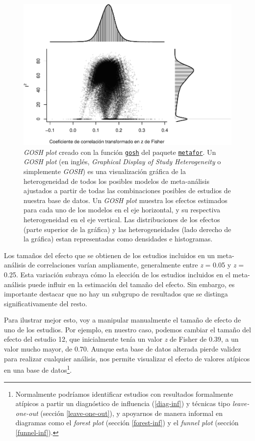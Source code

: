 \documentclass[
  bookmarksnumbered]{article}
\begin{document}
\begin{figure}
\centering
\includegraphics{Meta-analysis_files/figure-latex/gosh1-1.pdf}
\caption{\label{fig:gosh1}\emph{GOSH plot} creado con la función \href{https://www.metafor-project.org/doku.php/plots:gosh_plot}{\texttt{gosh}} del paquete \href{https://www.metafor-project.org/doku.php}{\texttt{metafor}}. Un \emph{GOSH plot} (en inglés, \emph{Graphical Display of Study Heterogeneity} o simplemente \emph{GOSH}) es una visualización gráfica de la heterogeneidad de todos los posibles modelos de meta-análisis ajustados a partir de todas las combinaciones posibles de estudios de nuestra base de datos. Un \emph{GOSH plot} muestra los efectos estimados para cada uno de los modelos en el eje horizontal, y su respectiva heterogeneidad en el eje vertical. Las distribuciones de los efectos (parte superior de la gráfica) y las heterogeneidades (lado derecho de la gráfica) estan representadas como densidades e histogramas.}
\end{figure}

Los tamaños del efecto que se obtienen de los estudios incluidos en un meta-análisis de correlaciones varían ampliamente, generalmente entre \emph{z} = 0.05 y \emph{z} = 0.25. Esta variación subraya cómo la elección de los estudios incluidos en el meta-análisis puede influir en la estimación del tamaño del efecto. Sin embargo, es importante destacar que no hay un subgrupo de resultados que se distinga significativamente del resto.

Para ilustrar mejor esto, voy a manipular manualmente el tamaño de efecto de uno de los estudios. Por ejemplo, en nuestro caso, podemos cambiar el tamaño del efecto del estudio 12, que inicialmente tenía un valor \emph{z} de Fisher de 0.39, a un valor mucho mayor, de 0.70. Aunque esta base de datos alterada pierde validez para realizar cualquier análisis, nos permite visualizar el efecto de valores atípicos en una base de datos\footnote{Normalmente podríamos identificar estudios con resultados formalmente atípicos a partir un diagnóstico de influencia (\ref{diag-inf}) y técnicas tipo \emph{leave-one-out} (sección \ref{leave-one-out}), y apoyarnos de manera informal en diagramas como el \emph{forest plot} (sección \ref{forest-inf}) y el \emph{funnel plot} (sección \ref{funnel-inf}).}.
\end{document}
